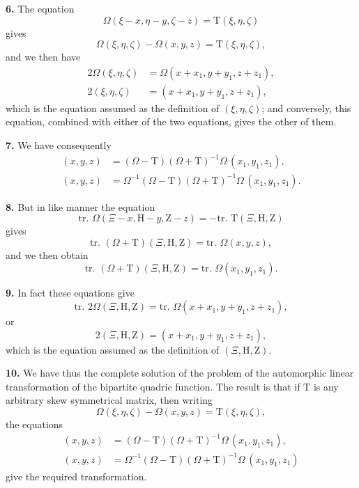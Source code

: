 \documentclass[12pt,a4paper]{article}
\theoremstyle{definition}
\begin{document}
\newpage

\medskip
\noindent\textbf{6.} The equation
\[\Omega(\xi-x, \eta-y, \zeta-z) = \mathrm{T}(\xi,\eta,\zeta)\]
gives
\[\Omega(\xi,\eta,\zeta) - \Omega(x,y,z) = \mathrm{T}(\xi,\eta,\zeta),\]
and we then have
\begin{align*}
2\Omega(\xi,\eta,\zeta) &= \Omega(x+x_1, y+y_1, z+z_1), \\
2(\xi,\eta,\zeta) &= (x+x_1, y+y_1, z+z_1),
\end{align*}
which is the equation assumed as the definition of $(\xi,\eta,\zeta)$; and conversely, this equation, combined with either of the two equations, gives the other of them.

\medskip
\noindent\textbf{7.} We have consequently
\begin{align*}
(x,y,z) &= (\Omega - \mathrm{T})(\Omega + \mathrm{T})^{-1}\Omega\,(x_1,y_1,z_1), \\
(x,y,z) &= \Omega^{-1}(\Omega - \mathrm{T})(\Omega + \mathrm{T})^{-1}\Omega\,(x_1,y_1,z_1).
\end{align*}

\medskip
\noindent\textbf{8.} But in like manner the equation
\[\text{tr. }\Omega(\Xi-x, \mathrm{H}-y, \mathrm{Z}-z) = -\text{tr. }\mathrm{T}(\Xi,\mathrm{H},\mathrm{Z})\]
gives
\[\text{tr. }(\Omega + \mathrm{T})(\Xi,\mathrm{H},\mathrm{Z}) = \text{tr. }\Omega(x,y,z),\]
and we then obtain
\[\text{tr. }(\Omega + \mathrm{T})(\Xi,\mathrm{H},\mathrm{Z}) = \text{tr. }\Omega(x_1,y_1,z_1).\]

\medskip
\noindent\textbf{9.} In fact these equations give
\[\text{tr. }2\Omega(\Xi,\mathrm{H},\mathrm{Z}) = \text{tr. }\Omega(x+x_1, y+y_1, z+z_1),\]
or
\[2(\Xi,\mathrm{H},\mathrm{Z}) = (x+x_1, y+y_1, z+z_1),\]
which is the equation assumed as the definition of $(\Xi,\mathrm{H},\mathrm{Z})$.

\medskip
\noindent\textbf{10.} We have thus the complete solution of the problem of the automorphic linear transformation of the bipartite quadric function. The result is that if $\mathrm{T}$ is any arbitrary skew symmetrical matrix, then writing
\[\Omega(\xi,\eta,\zeta) - \Omega(x,y,z) = \mathrm{T}(\xi,\eta,\zeta),\]
the equations
\begin{align*}
(x,y,z) &= (\Omega - \mathrm{T})(\Omega + \mathrm{T})^{-1}\Omega\,(x_1,y_1,z_1), \\
(x,y,z) &= \Omega^{-1}(\Omega - \mathrm{T})(\Omega + \mathrm{T})^{-1}\Omega\,(x_1,y_1,z_1)
\end{align*}
give the required transformation.
\end{document}
